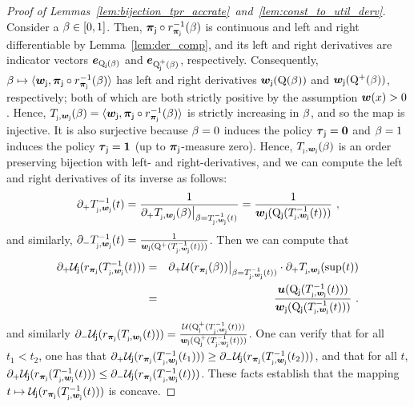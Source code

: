 \begin{proof}[Proof of Lemmas~\ref{lem:bijection_tpr_accrate}~and~\ref{lem:const_to_util_derv}] Consider a $\accrate \in [0,1]$. Then, $\distj \circ \ratef_{\distj}^{-1}(\accrate)$ is continuous and left and right differentiable by Lemma~\ref{lem:der_comp}, and its left and right derivatives are indicator vectors $\bolde_{\RCDFj(\accrate)}$ and $\bolde_{\RCDFplj(\accrate)}$, respectively. 
	Consequently, $\accrate \mapsto \langle \boldwj, \distj \circ \ratef_{\distj}^{-1}(\accrate) \rangle$ has left and right derivatives $\boldwj(\RCDF(\accrate))$ and $\boldwj(\RCDFpl(\accrate))$, 
	respectively; both of which are both strictly positive by the assumption $\boldw(x) > 0$. 
	Hence, $\constfj(\accrate) = \langle \boldwj, \distj \circ \ratef_{\distj}^{-1}(\accrate) \rangle$ is strictly increasing  in $\accrate$, and so the map is injective. 
	It is also surjective because $\accrate = 0$ induces the policy $\polj = \mathbf{0}$ and $\accrate = 1$ induces the policy $\polj = \mathbf{1}$ (up to $\distj$-measure zero). Hence, $\constfj(\accrate)$ is an order preserving bijection with left- and right-derivatives, and we can compute the left and right derivatives of its inverse as follows:
	\begin{eqnarray*}
	\partial_+ \constfj^{-1}(t) = \frac{1}{\partial_+ \constfj(\accrate) \big{|}_{\accrate = \constfj^{-1}(t)}} = \frac{1}{\boldwj(\RCDFj(\constfj^{-1}(t)))}~,
	\end{eqnarray*}
	and similarly, $\partial_- \constfj^{-1}(t) = \frac{1}{\boldwj(\RCDFpl(\constfj^{-1}(t)))}$. Then we can compute that
	\begin{eqnarray*}
	\partial_+ \Util\supj(\ratef_{\distj}(\constfj^{-1}(t))) &=& \partial_+\Util(\ratef_{\distj}(\accrate)) \big{|}_{\accrate = \constfj^{-1}(t))} \cdot \partial_+ \constfj(\sup(t))\\
	&=& \frac{\util(\RCDFj(\constfj^{-1}(t)))}{\boldwj(\RCDFj(\constfj^{-1}(t)))}~.
	\end{eqnarray*}
	and similarly $\partial_- \Util\supj(\ratef_{\distj}(\constfj(t))) = \frac{\Util(\RCDFplj(\constfj^{-1}(t)))}{\boldwj(\RCDFplj(\constfj^{-1}(t)))}$. One can verify that for all $t_1 < t_2$, one has that $\partial_+ \Util\supj(\ratef_{\distj}(\constfj^{-1}(t_1))) \ge \partial_- \Util\supj(\ratef_{\distj}(\constfj^{-1}(t_2)))$, and that for all $t$, $\partial_+ \Util\supj(\ratef_{\distj}(\constfj^{-1}(t))) \le \partial_- \Util\supj(\ratef_{\distj}(\constfj^{-1}(t)))$. These facts establish that the mapping $t\mapsto \Util\supj(\ratef_{\distj}(\constfj^{-1}(t)))$ is concave. 
	\end{proof}



